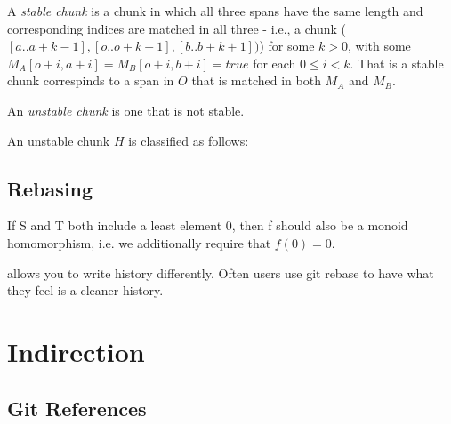 A \textit{stable chunk} is a chunk in which all three spans have the same length
 and corresponding indices are matched in all three - i.e., a chunk
($[a..a+k-1],[o..o+k-1],[b..b+k+1])$) for some $k > 0$, with some
$M_A[o+i,a+i] = M_B[o+i, b+i] = true$ for each $0 \leq i < k$. 
That is a stable chunk correspinds to a span in $O$ that is matched in both 
$M_A$ and $M_B$.




An \textit{unstable chunk} is one that is not stable. 





An unstable chunk $H$ is classified as follows:


\section{Rebasing}



If S and T both include a least element 0, then f should also be a
monoid homomorphism, i.e. we additionally require that
$f(0) = 0$.


allows you to write history differently. Often users use git rebase to 
have what they feel is a cleaner history.

\chapter{Indirection}

\section{Git References}

\begin{figure}[h]
\end{figure}

